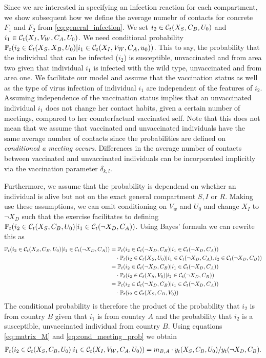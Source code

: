 Since we are interested in specifying an infection reaction for each compartment, we show subsequent how we define the average numebr of contacts for concrete $F_1$ and $F_2$ from \eqref{eq:general_infection}. We set $i_2 \in \mathcal{C}_t(X_S, C_B, U_0)$ and $i_1 \in \mathcal{C}_t(X_I, V_W, C_A, U_0)$. We need conditional probability $\mathbb{P}_t(i_2 \in \mathcal{C}_t(X_S, X_B, U_0)|i_1 \in \mathcal{C}_t(X_I, V_W, C_A, u_0))$. This to say, the probability that the individual that can be infected ($i_2$) is susceptible, unvaccinated and from area two given that individual $i_1$ is infected with the wild type, unvaccinated and from area one. We facilitate our model and assume that the vaccination status as well as the type of virus infection of individual $i_1$ are independent of the features of $i_2$. Assuming independence of the vaccination status implies that an unvaccinated individual $i_1$ does not change her contact habits, given a certain number of meetings, compared to her counterfactual vaccinated self. Note that this does not mean that we assume that vaccinated and unvaccinated individuals have the same average number of contacts since the probabilities are defined on \textit{conditioned a meeting occurs}. Differences in the average number of contacts between vaccinated and unvaccinated individuals can be incorporated implicitly via the vaccination parameter $\delta_{k,l}$. 

Furthermore, we assume that the probability is dependend on whether an individual is alive but not on the exact general compartment $S, I$ or $R$. Making use these assumptions, we can omit conditioning on $V_w$ and $U_0$ and change $X_I$ to $\neg X_D$ such that the exercise facilitates to defining $\mathbb{P}_t(i_2 \in \mathcal{C}_t(X_S, C_B, U_0)|i_1 \in \mathcal{C}_t(\neg X_D, C_A))$. Using Bayes' formula we can rewrite this as
\begin{align}
\label{eq:cond_meeting_prob}
\mathbb{P}_t(i_2 \in \mathcal{C}_t(X_S, C_B, U_0)|i_1 \in \mathcal{C}_t(\neg X_D, C_A)) &= \mathbb{P}_t(i_2 \in \mathcal{C}_t(\neg X_D, C_B) | i_1 \in \mathcal{C}_t(\neg X_D, C_A) )  \notag \\
& \quad \cdot \mathbb{P}_t(i_2 \in \mathcal{C}_t(X_S, U_0) | i_1 \in \mathcal{C}_t(\neg X_D, C_A), i_2 \in \mathcal{C}_t(\neg X_D, C_B) ) \notag \\
&= \mathbb{P}_t(i_2 \in \mathcal{C}_t(\neg X_D, C_B) | i_1 \in \mathcal{C}_t(\neg X_D, C_A) )  \notag \\
& \quad \cdot \mathbb{P}_t(i_2 \in \mathcal{C}_t(X_S, V_0)|i_2 \in \mathcal{C}_t(\neg X_D, C_B)) \notag\\
&= \mathbb{P}_t(i_2 \in \mathcal{C}_t(\neg X_D, C_B) | i_1 \in \mathcal{C}_t(\neg X_D, C_A) ) \notag \\
& \quad \cdot \mathbb{P}_t(i_2 \in \mathcal{C}_t(X_S, C_B, V_0))
\end{align} 
The conditional probability is therefore the product of the probability that $i_2$ is from country $B$ given that $i_1$ is from country $A$ and the probability that $i_2$ is a susceptible, unvaccinated individual from country $B$. Using equations \eqref{eq:matrix_M} and \eqref{eq:cond_meeting_prob} we obtain
\begin{align}
\label{eq:cond_prob_meeting_final}
\mathbb{P}_t(i_2 \in \mathcal{C}_t(X_S, C_B, U_0)|i_1 \in \mathcal{C}_t(X_I, V_W, C_A, U_0)) = m_{B,A} \cdot y_t(X_S, C_B, U_0) / y_t(\neg X_D, C_B). 
\end{align}


